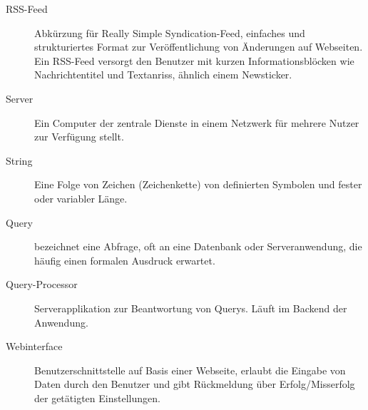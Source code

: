 \begin{description}
\item[RSS-Feed] Abkürzung für Really Simple Syndication-Feed, einfaches und
strukturiertes Format zur Veröffentlichung von Änderungen auf Webseiten. 
Ein RSS-Feed versorgt den Benutzer mit kurzen Informationsblöcken wie 
Nachrichtentitel und Textanriss, ähnlich einem Newsticker.

\item[Server] Ein Computer der zentrale Dienste in einem Netzwerk für mehrere
Nutzer zur Verfügung stellt. 

\item[String] Eine Folge von Zeichen (Zeichenkette) von definierten Symbolen und
fester oder variabler Länge.

\item[Query] bezeichnet eine Abfrage, oft an eine Datenbank oder
Serveranwendung, die häufig einen formalen Ausdruck erwartet.

\item[Query-Processor] Serverapplikation zur Beantwortung von Querys. Läuft im
Backend der Anwendung.

\item[Webinterface] Benutzerschnittstelle auf Basis einer Webseite, erlaubt die
Eingabe von Daten durch den Benutzer und gibt Rückmeldung über Erfolg/Misserfolg
der getätigten Einstellungen.

\end{description}
